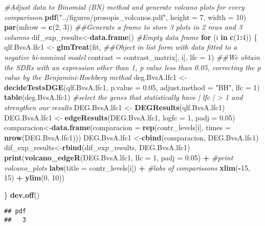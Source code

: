 \documentclass[]{article}
\newenvironment{Shaded}{\begin{snugshade}}{\end{snugshade}}
\newcommand{\CommentTok}[1]{\textcolor[rgb]{0.56,0.35,0.01}{\textit{#1}}}
\newcommand{\ControlFlowTok}[1]{\textcolor[rgb]{0.13,0.29,0.53}{\textbf{#1}}}
\newcommand{\DataTypeTok}[1]{\textcolor[rgb]{0.13,0.29,0.53}{#1}}
\newcommand{\DecValTok}[1]{\textcolor[rgb]{0.00,0.00,0.81}{#1}}
\newcommand{\FloatTok}[1]{\textcolor[rgb]{0.00,0.00,0.81}{#1}}
\newcommand{\KeywordTok}[1]{\textcolor[rgb]{0.13,0.29,0.53}{\textbf{#1}}}
\newcommand{\NormalTok}[1]{#1}
\newcommand{\OperatorTok}[1]{\textcolor[rgb]{0.81,0.36,0.00}{\textbf{#1}}}
\newcommand{\StringTok}[1]{\textcolor[rgb]{0.31,0.60,0.02}{#1}}
\begin{document}
\begin{Shaded}
\begin{Highlighting}[]
\CommentTok{#Adjust data to Binomial (BN) method and generate volcano plots for every comparisson}
\KeywordTok{pdf}\NormalTok{(}\StringTok{"../figures/prosopis_volcanos.pdf"}\NormalTok{, }\DataTypeTok{height =} \DecValTok{7}\NormalTok{, }\DataTypeTok{width =} \DecValTok{10}\NormalTok{)}
\KeywordTok{par}\NormalTok{(}\DataTypeTok{mfrow =} \KeywordTok{c}\NormalTok{(}\DecValTok{2}\NormalTok{, }\DecValTok{3}\NormalTok{)) }\CommentTok{##Generate a frame to store 3 plots in 2 rows and 3 columns}
\NormalTok{dif_exp_results<-}\KeywordTok{data.frame}\NormalTok{() }\CommentTok{#Empty data frame}
\ControlFlowTok{for}\NormalTok{ (i }\ControlFlowTok{in} \KeywordTok{c}\NormalTok{(}\DecValTok{1}\OperatorTok{:}\DecValTok{4}\NormalTok{)) \{}
\NormalTok{  qlf.BvsA.lfc1 <-}\StringTok{ }\KeywordTok{glmTreat}\NormalTok{(fit, }\CommentTok{##Object in list form with data fitted to a negative bi-nominal model}
                            \DataTypeTok{contrast =}\NormalTok{ contrast_matrix[, i], }
                            \DataTypeTok{lfc =} \DecValTok{1}\NormalTok{)}
  \CommentTok{##We obtain the SDRs with an expression other than 1, p value less than 0.05, correcting the p value by the Benjamini-Hochberg method}
\NormalTok{  deg.BvsA.lfc1 <-}\StringTok{ }\KeywordTok{decideTestsDGE}\NormalTok{(qlf.BvsA.lfc1, }\DataTypeTok{p.value =} \FloatTok{0.05}\NormalTok{, }\DataTypeTok{adjust.method =} \StringTok{"BH"}\NormalTok{, }\DataTypeTok{lfc =} \DecValTok{1}\NormalTok{)}
  \KeywordTok{table}\NormalTok{(deg.BvsA.lfc1)}
  \CommentTok{#select the genes that statistically have | lfc | > 1 and strengthen our results}
\NormalTok{  DEG.BvsA.lfc1 <-}\StringTok{ }\KeywordTok{DEGResults}\NormalTok{(qlf.BvsA.lfc1)}
\NormalTok{  DEG.BvsA.lfc1 <-}\StringTok{ }\KeywordTok{edgeResults}\NormalTok{(DEG.BvsA.lfc1, }\DataTypeTok{logfc =} \DecValTok{1}\NormalTok{, }\DataTypeTok{padj =} \FloatTok{0.05}\NormalTok{)}
\NormalTok{  comparacion<-}\KeywordTok{data.frame}\NormalTok{(}\DataTypeTok{comparacion =} \KeywordTok{rep}\NormalTok{(contr_levels[i], }\DataTypeTok{times =} \KeywordTok{nrow}\NormalTok{(DEG.BvsA.lfc1)))}
\NormalTok{  DEG.BvsA.lfc1 <-}\KeywordTok{cbind}\NormalTok{(comparacion, DEG.BvsA.lfc1)}
\NormalTok{  dif_exp_results<-}\KeywordTok{rbind}\NormalTok{(dif_exp_results, DEG.BvsA.lfc1)}
  \KeywordTok{print}\NormalTok{(}\KeywordTok{volcano_edgeR}\NormalTok{(DEG.BvsA.lfc1, }\DataTypeTok{lfc =} \DecValTok{1}\NormalTok{, }\DataTypeTok{padj =} \FloatTok{0.05}\NormalTok{) }\OperatorTok{+}\StringTok{ }\CommentTok{#print volcano_plots}
\StringTok{          }\KeywordTok{labs}\NormalTok{(}\DataTypeTok{title =}\NormalTok{ contr_levels[i]) }\OperatorTok{+}\StringTok{ }\CommentTok{#labs of comparissons}
\StringTok{          }\KeywordTok{xlim}\NormalTok{(}\OperatorTok{-}\DecValTok{15}\NormalTok{, }\DecValTok{15}\NormalTok{) }\OperatorTok{+}
\StringTok{          }\KeywordTok{ylim}\NormalTok{(}\DecValTok{0}\NormalTok{, }\DecValTok{10}\NormalTok{))}
  
\NormalTok{\}}
\KeywordTok{dev.off}\NormalTok{()}
\end{Highlighting}
\end{Shaded}

\begin{verbatim}
## pdf 
##   3
\end{verbatim}
\end{document}
